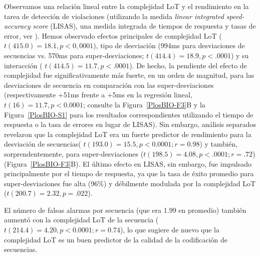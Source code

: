 Observamos una relación lineal entre la complejidad LoT y el rendimiento en la tarea de detección de violaciones (utilizando la medida \textit{linear integrated speed-accuracy score} (LISAS), una medida integrada de tiempos de respuesta y tasas de error, ver \cite{f87,f88}). Hemos observado efectos principales de complejidad LoT ($t(415.0) = 18.1 , p <0,0001$), tipo de desviación (994ms para desviaciones de secuencias vs. 570ms para super-desviaciones; $t (414.4) = 18.9 , p < .0001$) y su interacción ( $t(414.5) = 11. 7 , p <.0001$). De hecho, la pendiente del efecto de complejidad fue significativamente más fuerte, en un orden de magnitud, para las desviaciones de secuencia en comparación con las super-desviaciones (respectivamente +51ms frente a +5ms en la regresión lineal, $t(16) = 11.7, p <0.0001$; consulte la Figura~\ref{PlosBIO-F3}B y la Figura~\ref{PlosBIO-S1} para los resultados correspondientes utilizando el tiempo de respuesta o la tasa de errores en lugar de LISAS). Sin embargo, análisis separados revelaron que la complejidad LoT era un fuerte predictor de rendimiento para la desviación de secuencias( $t( 193.0) = 15.5, p <0.0001 ; r = 0.98$) y también, sorprendentemente, para super-desviaciones ($t (198.5) = 4.08, p < .0001 ; r = .72$) (Figura~\ref{PlosBIO-F3}B). El último efecto en LISAS, sin embargo, fue impulsado principalmente por el tiempo de respuesta, ya que la tasa de éxito promedio para super-desviaciones fue alta (96\%) y débilmente modulada por la complejidad LoT ($t(200.7) = 2.32, p =.022$).


El número de falsas alarmas por secuencia (que era 1.99 en promedio) también aumentó con la complejidad LoT de la secuencia ($t(214.4)= 4.20, p <0.0001 ; r = 0.74$), lo que sugiere de nuevo que la complejidad LoT es un buen predictor de la calidad de la codificación de secuencias.


